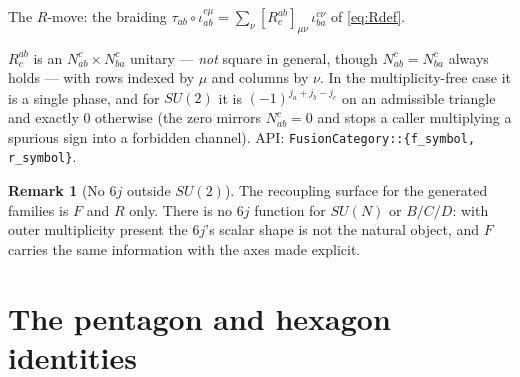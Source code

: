 \documentclass[11pt,a4paper]{article}
\theoremstyle{plain}
\theoremstyle{definition}
\newtheorem{remark}[theorem]{Remark}
\newcommand{\fvert}[2]{\node[fvertex] at (#1) {};%
  \node[fleg, right=1pt] at (#1) {$#2$};}
\newcommand{\code}[1]{\texttt{#1}}
\begin{document}
\begin{center}

\smallskip
{\small The $R$-move: the braiding
$\tau_{ab}\circ\iota^{c\mu}_{ab}=\sum_\nu[R^{ab}_c]_{\mu\nu}\,\iota^{c\nu}_{ba}$
of \eqref{eq:Rdef}.}
\end{center}

$R^{ab}_c$ is an $N^c_{ab}\times N^c_{ba}$ unitary --- \emph{not} square in
general, though $N^c_{ab}=N^c_{ba}$ always holds --- with rows indexed by $\mu$
and columns by $\nu$. In the multiplicity-free case it is a single phase, and
for $SU(2)$ it is $(-1)^{j_a+j_b-j_c}$ on an admissible triangle and exactly
$0$ otherwise (the zero mirrors $N^c_{ab}=0$ and stops a caller multiplying a
spurious sign into a forbidden channel). API:
\code{FusionCategory::\{f\_symbol, r\_symbol\}}.

\begin{remark}[No $6j$ outside $SU(2)$]
The recoupling surface for the generated families is $F$ and $R$ only. There is
no $6j$ function for $SU(N)$ or $B/C/D$: with outer multiplicity present the
$6j$'s scalar shape is not the natural object, and $F$ carries the same
information with the axes made explicit.
\end{remark}

\section{The pentagon and hexagon identities}
\label{sec:pentagon}
\end{document}
